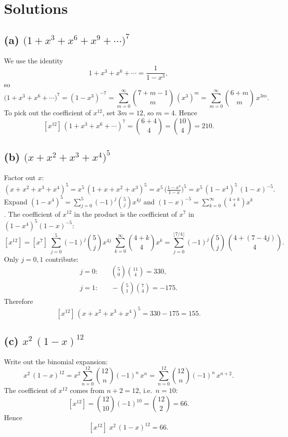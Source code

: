 \documentclass[docmute]{article}
\begin{document}
\section*{Solutions}

\subsection*{(a) \(\bigl(1 + x^3 + x^6 + x^9 + \cdots\bigr)^7\)}
We use the identity
\[
1 + x^3 + x^6 + \cdots = \frac1{1 - x^3},
\]
so
\[
\bigl(1 + x^3 + x^6 + \cdots\bigr)^7
= (1 - x^3)^{-7}
= \sum_{m=0}^\infty \binom{7 + m - 1}{m}\,(x^3)^m
= \sum_{m=0}^\infty \binom{6 + m}{m}\,x^{3m}.
\]
To pick out the coefficient of \(x^{12}\), set \(3m=12\), so \(m=4\). Hence
\[
\boxed{
[x^{12}]\,(1 + x^3 + x^6 + \cdots)^7
= \binom{6+4}{4}
= \binom{10}{4}
=210.
}
\]

\subsection*{(b) \(\bigl(x + x^2 + x^3 + x^4\bigr)^5\)}  
Factor out \(x\):
\[
(x + x^2 + x^3 + x^4)^5
= x^5\,(1 + x + x^2 + x^3)^5
= x^5\,\bigl(\tfrac{1 - x^4}{1 - x}\bigr)^5
= x^5\,(1 - x^4)^5\,(1 - x)^{-5}.
\]
Expand \((1 - x^4)^5=\sum_{j=0}^5(-1)^j\binom{5}{j}x^{4j}\) and \((1 - x)^{-5}=\sum_{k=0}^\infty\binom{4 + k}{4}x^k\).  The coefficient of \(x^{12}\) in the product is the coefficient of \(x^7\) in \((1 - x^4)^5(1 - x)^{-5}\):
\[
[x^{12}]
= [x^7]\;\sum_{j=0}^5(-1)^j\binom{5}{j}x^{4j}
           \;\sum_{k=0}^\infty\binom{4+k}{4}x^k
= \sum_{j=0}^{\lfloor7/4\rfloor}(-1)^j\binom{5}{j}\,
  \binom{4+(7-4j)}{4}.
\]
Only \(j=0,1\) contribute:
\[
\begin{aligned}
j=0:&\quad \binom{5}{0}\binom{11}{4} = 330,\\
j=1:&\quad -\binom{5}{1}\binom{7}{4} = -175.
\end{aligned}
\]
Therefore
\[
\boxed{
[x^{12}]\,(x + x^2 + x^3 + x^4)^5 = 330 - 175 = 155.
}
\]

\subsection*{(c) \(x^2\,(1 - x)^{12}\)}  
Write out the binomial expansion:
\[
x^2\,(1 - x)^{12}
= x^2\sum_{n=0}^{12} \binom{12}{n}(-1)^n\,x^n
= \sum_{n=0}^{12} \binom{12}{n}(-1)^n\,x^{n+2}.
\]
The coefficient of \(x^{12}\) comes from \(n+2=12\), i.e.\ \(n=10\):
\[
[x^{12}] = \binom{12}{10}(-1)^{10}
= \binom{12}{2}
= 66.
\]
Hence
\[
\boxed{
[x^{12}]\;x^2\,(1 - x)^{12} = 66.
}
\]
\end{document}
